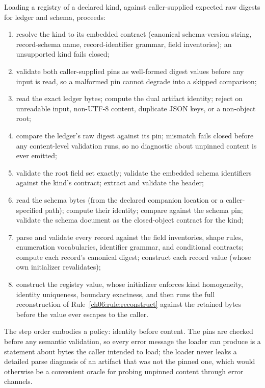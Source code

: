 \begin{protocol}\label{ch06:prot:load}
Loading a registry of a declared kind, against caller-supplied expected
raw digests for ledger and schema, proceeds:
\begin{enumerate}
\item resolve the kind to its embedded contract (canonical schema-version
string, record-schema name, record-identifier grammar, field
inventories); an unsupported kind fails closed;
\item validate both caller-supplied pins as well-formed digest values
before any input is read, so a malformed pin cannot degrade into a
skipped comparison;
\item read the exact ledger bytes; compute the dual artifact identity;
reject on unreadable input, non-UTF-8 content, duplicate JSON keys,
or a non-object root;
\item compare the ledger's raw digest against its pin; mismatch fails
closed before any content-level validation runs, so no diagnostic
about unpinned content is ever emitted;
\item validate the root field set exactly; validate the embedded schema
identifiers against the kind's contract; extract and validate the
header;
\item read the schema bytes (from the declared companion location or a
caller-specified path); compute their identity; compare against the
schema pin; validate the schema document as the closed-object
contract for the kind;
\item parse and validate every record against the field inventories,
shape rules, enumeration vocabularies, identifier grammar, and
conditional contracts; compute each record's canonical digest;
construct each record value (whose own initializer revalidates);
\item construct the registry value, whose initializer enforces kind
homogeneity, identity uniqueness, boundary exactness, and then runs
the full reconstruction of Rule~\ref{ch06:rule:reconstruct} against
the retained bytes before the value ever escapes to the caller.
\end{enumerate}
\end{protocol}

The step order embodies a policy: identity before content. The pins are
checked before any semantic validation, so every error message the
loader can produce is a statement about bytes the caller intended to
load; the loader never leaks a detailed parse diagnosis of an artifact
that was not the pinned one, which would otherwise be a convenient
oracle for probing unpinned content through error channels.

